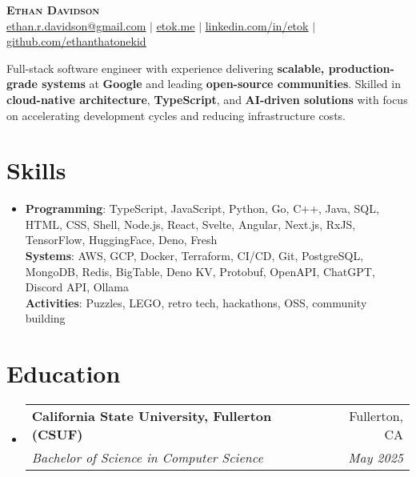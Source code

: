 \documentclass[letterpaper,11pt]{article}
\makeatletter
\newcommand{\resumeItem}[1]{
  \item\small{
    {#1 \vspace{-2pt}}
  }
}
\newcommand{\resumeSubheading}[4]{
  \vspace{-2pt}\item
    \begin{tabular*}{0.97\textwidth}[t]{l@{\extracolsep{\fill}}r}
      \textbf{#1} & #2 \\
      \textit{\small#3} & \textit{\small #4} \\
    \end{tabular*}\vspace{-7pt}
}
\newcommand{\resumeSubHeadingListStart}{\begin{itemize}[leftmargin=0.15in, label={}]}
\newcommand{\resumeSubHeadingListEnd}{\end{itemize}}
\makeatother
\begin{document}
\begin{center}
  \textbf{\Huge \scshape Ethan Davidson} \\ \vspace{1pt}
  \small \href{mailto:ethan.r.davidson@gmail.com}{\underline{ethan.r.davidson@gmail.com}} $|$ 
  \href{https://etok.me}{\underline{etok.me}} $|$
  \href{https://linkedin.com/in/etok}{\underline{linkedin.com/in/etok}} $|$
  \href{https://github.com/ethanthatonekid}{\underline{github.com/ethanthatonekid}}
\end{center}

\resumeItem{Full-stack software engineer with experience delivering \textbf{scalable, production-grade systems} at \textbf{Google} and leading \textbf{open-source communities}. Skilled in \textbf{cloud-native architecture}, \textbf{TypeScript}, and \textbf{AI-driven solutions} with focus on accelerating development cycles and reducing infrastructure costs.}

\section{Skills}
\begin{itemize}[leftmargin=0.15in, label={}]
    \resumeItem{
      \textbf{Programming}{: TypeScript, JavaScript, Python, Go, C++, Java, SQL, HTML, CSS, Shell, Node.js, React, Svelte, Angular, Next.js, RxJS, TensorFlow, HuggingFace, Deno, Fresh} \\
      \textbf{Systems}{: AWS, GCP, Docker, Terraform, CI/CD, Git, PostgreSQL, MongoDB, Redis, BigTable, Deno KV, Protobuf, OpenAPI, ChatGPT, Discord API, Ollama} \\
      \textbf{Activities}{: Puzzles, LEGO, retro tech, hackathons, OSS, community building}
    }
 \end{itemize}

\section{Education}
\resumeSubHeadingListStart
  \resumeSubheading
    {California State University, Fullerton (CSUF)}{Fullerton, CA}
    {Bachelor of Science in Computer Science}{May 2025}
\resumeSubHeadingListEnd

\end{document}
